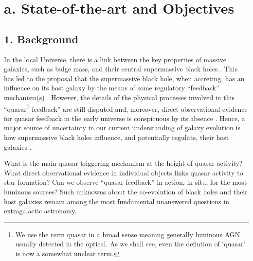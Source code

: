 
\section*{a. State-of-the-art and Objectives}

\subsection*{1. Background}

\smallskip
\smallskip
\noindent
In the local Universe, there is a link between the key properties of
massive galaxies, such as bulge mass, and their central supermassive
black holes \citep[SMBHs; e.g., ][]{McLure_Dunlop2002, HaringRix2004,
Salviander2007, Greene2010, KormendyHo2013}. This has led to the
proposal that the supermassive black hole, when accreting, has an
influence on its host galaxy by the means of some regulatory
``feedback'' mechanism(s) \citep[e.g., ][]{Sijacki2007, Hopkins2008a,
AlexanderHickox2012, Fabian2012, KingPounds2015}. However, the details
of the physical processes involved in this ``quasar\footnote{We use
the term quasar in a broad sense meaning generally luminous AGN
usually detected in the optical. As we shall see, even the defintion
of `quasar' is now a somewhat unclear term.} feedback'' are still
disputed and, moreover, direct observational evidence for quasar
feedback in the early universe is conspicuous by its absence
\citep[e.g., ][]{HeckmanBest2014, NaabOstriker2017}. Hence, a major
source of uncertainty in our current understanding of galaxy evolution
is how supermassive black holes influence, and potentially regulate,
their host galaxies \citep{Vogelsberger2013, Vogelsberger2014,
Schaye2015, Angles-Alcazar2013, Angles-Alcazar2017}.

\smallskip
\smallskip
\noindent
What is the main quasar triggering mechanism at the height of quasar
activity? What direct observational evidence in individual objects
links quasar activity to star formation?  Can we observe ``quasar feedback''
in action, in situ, for the most luminous sources?  Such unknowns
about the co-evolution of black holes and their host galaxies remain
among the most fundamental unanswered questions in extragalactic
astronomy.  

